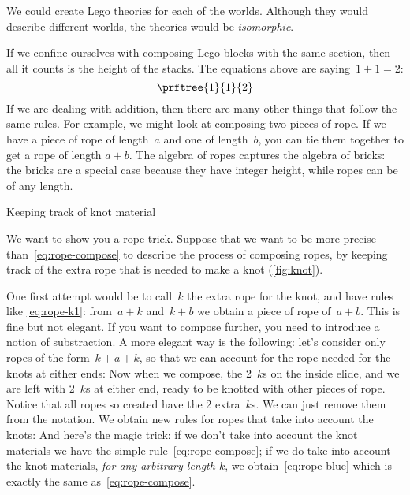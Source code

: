 We could create Lego theories for each of the worlds.
Although they would describe different worlds, the theories would be \emph{isomorphic}.

If we confine ourselves with composing Lego blocks with the same section, then all it counts is the height of the stacks.
The equations above are saying~$1+1=2$:
%
\begin{equation}
    \prftree{1}{1}{2}
\end{equation}
%
If we are dealing with addition, then there are many other things that follow the same rules.
For example, we might look at composing two pieces of rope.
If we have a piece of rope of length~$a$ and one of length~$b$, you can tie them together to get a rope of length $a+b$.
%
%
The algebra of ropes captures the algebra of bricks: the bricks are a special case because they have integer height, while ropes can be of any length.
\begin{marginfigure}
    \caption{Keeping track of knot material}
    \label{fig:knot}
\end{marginfigure}

We want to show you a rope trick.
Suppose that we want to be more precise than~\cref{eq:rope-compose} to describe the process of composing ropes, by keeping track of the extra rope that is needed to make a knot (\cref{fig:knot}).

One first attempt would be to call~$k$ the extra rope for the knot, and have rules like \cref{eq:rope-k1}: from~$a + k$ and~$k + b$ we obtain a piece of rope of~$a+b$.
%
%
%
This is fine but not elegant.
If you want to compose further, you need to introduce a notion of substraction.
%
%
A more elegant way is the following: let's consider only ropes of the form~$k + a + k$, so that we can account for the rope needed for the knots at either ends:
%
%
Now when we compose, the 2~$k$s on the inside elide, and we are left with 2~$k$s at either end, ready to be knotted with other pieces of rope.
Notice that all ropes so created have the 2 extra~$k$s.
We can just remove them from the notation.
We obtain new rules for ropes that take into account the knots:
%
%
And here's the magic trick: if we don't take into account the knot materials we have the simple rule~\cref{eq:rope-compose}; if we do take into account the knot materials, \emph{for any arbitrary length $k$}, we obtain~\cref{eq:rope-blue} which is exactly the same as~\cref{eq:rope-compose}.

